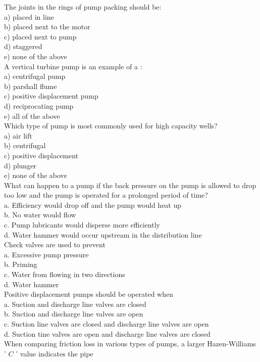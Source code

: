 The joints in the rings of pump packing should be:\\
a) placed in line\\
b) placed next to the motor\\
c) placed next to pump\\
d) staggered\\
e) none of the above\\
A vertical turbine pump is an example of a :\\
a) centrifugal pump\\
b) parshall flume\\
c) positive displacement pump\\
d) reciprocating pump\\
e) all of the above\\
 Which type of pump is most commonly used for high capacity wells?\\
a) air lift\\
b) centrifugal\\
c) positive displacement\\
d) plunger\\
e) none of the above\\
What can happen to a pump if the back pressure on the pump is allowed to drop too low and the pump is operated for a prolonged period of time?\\
a. Efficiency would drop off and the pump would heat up\\
b. No water would flow\\
c. Pump lubricants would disperse more efficiently\\
d. Water hammer would occur upstream in the distribution line\\
Check valves are used to prevent\\
a. Excessive pump pressure\\
b. Priming\\
c. Water from flowing in two directions\\
d. Water hammer\\
Positive displacement pumps should be operated when\\
a. Suction and discharge line valves are closed\\
b.  Suction and discharge line valves are open\\
c. Suction line valves are closed and discharge line valves are open\\
d. Suction tine valves are open and discharge line valves are closed\\
When comparing friction loss in various types of pumps, a larger Hazen-Williams ' $C$ ' value indicates the pipe\\
